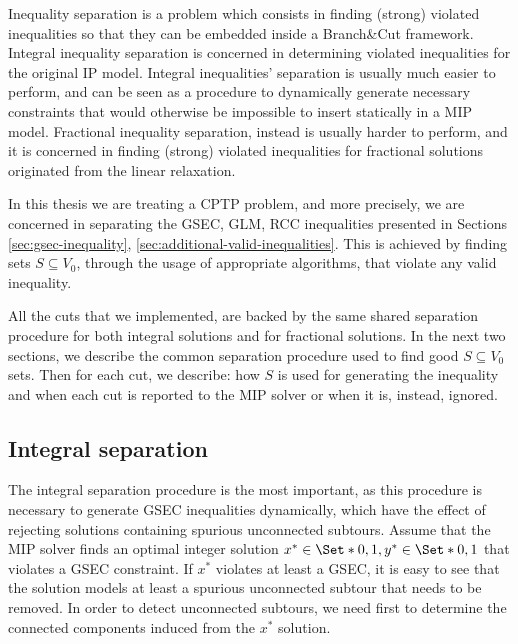 Inequality separation is a problem which consists in finding (strong) violated inequalities so that they can be embedded inside a Branch\&Cut framework.
Integral inequality separation is concerned in determining violated inequalities for the original IP model.
Integral inequalities' separation is usually much easier to perform, and can be seen as a procedure to dynamically generate necessary constraints that would otherwise be impossible to insert statically in a MIP model.
Fractional inequality separation, instead is usually harder to perform, and it is concerned in finding (strong) violated inequalities for fractional solutions originated from the linear relaxation.

In this thesis we are treating a CPTP problem, and more precisely, we are concerned in separating the GSEC, GLM, RCC inequalities presented in Sections \ref{sec:gsec-inequality}, \ref{sec:additional-valid-inequalities}.
This is achieved by finding sets $S \subseteq V_0$, through the usage of appropriate algorithms, that violate any valid inequality.

All the cuts that we implemented, are backed by the same shared separation procedure for both integral solutions and for fractional solutions.
In the next two sections, we describe the common separation procedure used to find good $S \subseteq V_0$ sets.
Then for each cut, we describe: how $S$ is used for generating the inequality and when each cut is reported to the MIP solver or when it is, instead, ignored.

\subsection{Integral separation}
\label{sec:impl-integral-separation}

The integral separation procedure is the most important, as this procedure is necessary to generate GSEC inequalities dynamically, which have the effect of rejecting solutions containing spurious unconnected subtours.
Assume that the MIP solver finds an optimal integer solution $x^* \in \Set*{0, 1}, y^* \in \Set*{0, 1}$ that violates a GSEC constraint.
If $x^*$ violates at least a GSEC, it is easy to see that the solution models at least a spurious unconnected subtour that needs to be removed.
In order to detect unconnected subtours, we need first to determine the connected components induced from the $x^*$ solution.

